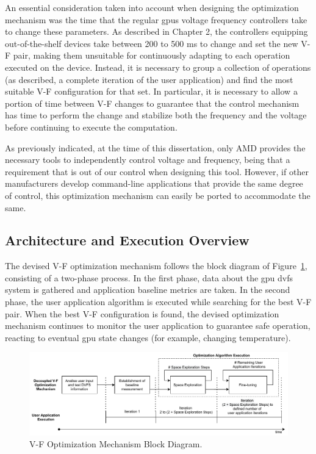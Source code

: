 An essential consideration taken into account when designing the optimization mechanism was the time that the regular \acrshort{gpu}s voltage frequency controllers take to change these parameters. As described in Chapter 2, the controllers equipping out-of-the-shelf devices take between 200 to 500 ms to change and set the new V-F pair, making them unsuitable for continuously adapting to each operation executed on the device. Instead, it is necessary to group a collection of operations (as described, a complete iteration of the user application) and find the most suitable V-F configuration for that set.
In particular, it is necessary to allow a portion of time between V-F changes to guarantee that the control mechanism has time to perform the change and stabilize both the frequency and the voltage before continuing to execute the computation.

As previously indicated, at the time of this dissertation, only AMD provides the necessary tools to independently control voltage and frequency, being that a requirement that is out of our control when designing this tool. However, if other manufacturers develop command-line applications that provide the same degree of control, this optimization mechanism can easily be ported to accommodate the same.


\subsection{Architecture and Execution Overview}


The devised V-F optimization mechanism follows the block diagram of Figure~\ref{fig:opt_mech}, consisting of a two-phase process. In the first phase, data about the \acrshort{gpu} \acrshort{dvfs} system is gathered and application baseline metrics are taken. In the second phase, the user application algorithm is executed while searching for the best V-F pair. When the best V-F configuration is found, the devised optimization mechanism continues to monitor the user application to guarantee safe operation, reacting to eventual \acrshort{gpu} state changes (for example, changing temperature).

\begin{figure}[htb]
  \centering
  \includegraphics[width=\textwidth]{Figures/Optimization/full_mech6.pdf}
  \caption{V-F Optimization Mechanism Block Diagram.}
  \label{fig:opt_mech}
\end{figure}

